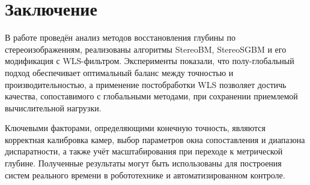 	\section*{Заключение}
	В работе проведён анализ методов восстановления глубины по стереоизображениям, реализованы алгоритмы StereoBM, StereoSGBM и его модификация с WLS-фильтром. Эксперименты показали, что полу-глобальный подход обеспечивает оптимальный баланс между точностью и производительностью, а применение постобработки WLS позволяет достичь качества, сопоставимого с глобальными методами, при сохранении приемлемой вычислительной нагрузки. 
	
	Ключевыми факторами, определяющими конечную точность, являются корректная калибровка камер, выбор параметров окна сопоставления и диапазона диспаратности, а также учёт масштабирования при переходе к метрической глубине. Полученные результаты могут быть использованы для построения систем реального времени в робототехнике и автоматизированном контроле.
	
	

